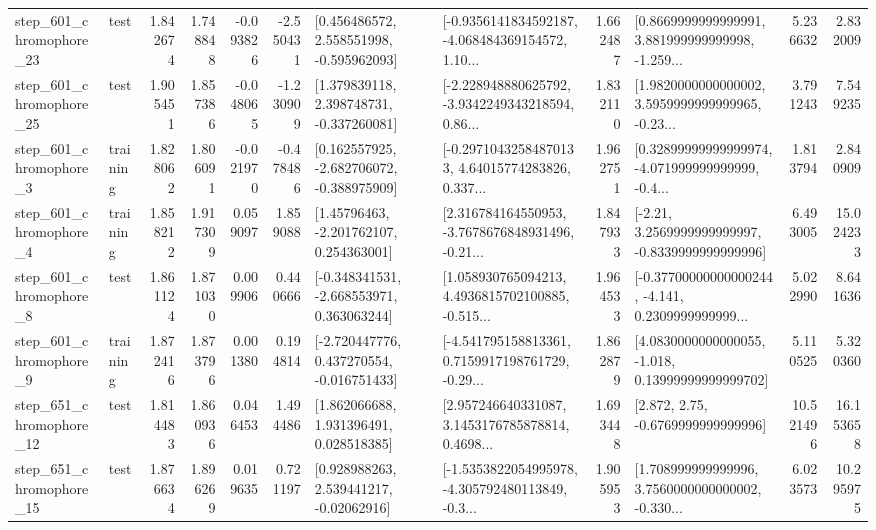 \begin{tabular}{llrrrrllrlrr}
  step\_601\_chromophore\_23 &      test &      1.842674 &    1.748848 &     -0.093826 & -2.550431 &    [0.456486572, 2.558551998, -0.595962093] &  [-0.9356141834592187, -4.068484369154572, 1.10... &       1.662487 &  [0.8669999999999991, 3.881999999999998, -1.259... &            5.236632 &          2.832009 \\
  step\_601\_chromophore\_25 &      test &      1.905451 &    1.857386 &     -0.048065 & -1.230909 &    [1.379839118, 2.398748731, -0.337260081] &  [-2.228948880625792, -3.9342249343218594, 0.86... &       1.832110 &  [1.9820000000000002, 3.5959999999999965, -0.23... &            3.791243 &          7.549235 \\
   step\_601\_chromophore\_3 &  training &      1.828062 &    1.806091 &     -0.021970 & -0.478486 &   [0.162557925, -2.682706072, -0.388975909] &  [-0.29710432584870133, 4.64015774283826, 0.337... &       1.962751 &  [0.32899999999999974, -4.071999999999999, -0.4... &            1.813794 &          2.840909 \\
   step\_601\_chromophore\_4 &  training &      1.858212 &    1.917309 &      0.059097 &  1.859088 &     [1.45796463, -2.201762107, 0.254363001] &  [2.316784164550953, -3.7678676848931496, -0.21... &       1.847933 &   [-2.21, 3.2569999999999997, -0.8339999999999996] &            6.493005 &         15.024233 \\
   step\_601\_chromophore\_8 &      test &      1.861124 &    1.871030 &      0.009906 &  0.440666 &   [-0.348341531, -2.668553971, 0.363063244] &  [1.058930765094213, 4.4936815702100885, -0.515... &       1.964533 &  [-0.37700000000000244, -4.141, 0.2309999999999... &            5.022990 &          8.641636 \\
   step\_601\_chromophore\_9 &  training &      1.872416 &    1.873796 &      0.001380 &  0.194814 &   [-2.720447776, 0.437270554, -0.016751433] &  [-4.541795158813361, 0.7159917198761729, -0.29... &       1.862879 &  [4.0830000000000055, -1.018, 0.13999999999999702] &            5.110525 &          5.320360 \\
  step\_651\_chromophore\_12 &      test &      1.814483 &    1.860936 &      0.046453 &  1.494486 &     [1.862066688, 1.931396491, 0.028518385] &  [2.957246640331087, 3.1453176785878814, 0.4698... &       1.693448 &                 [2.872, 2.75, -0.6769999999999996] &           10.521496 &         16.153658 \\
  step\_651\_chromophore\_15 &      test &      1.876634 &    1.896269 &      0.019635 &  0.721197 &     [0.928988263, 2.539441217, -0.02062916] &  [-1.5353822054995978, -4.305792480113849, -0.3... &       1.905953 &  [1.708999999999996, 3.7560000000000002, -0.330... &            6.023573 &         10.295975 \\

\end{tabular}
